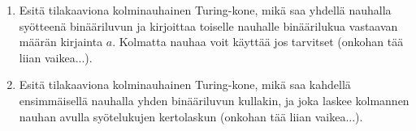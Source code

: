 \documentclass[finnish,11pt,draft]{article}
\newenvironment{automata}[1][2.8]%
{\begin{tikzpicture}[->,>=stealth',shorten >=1pt,auto,node distance=#1cm,semithick]}%
{\end{tikzpicture}}
\newenvironment{centerautomata}[1][2.8]%
{\begin{center}\begin{automata}[#1]}%
{\end{automata} \end{center}}
\newcommand{\spc}{\text{\textvisiblespace}}
\begin{document}
\begin{enumerate}

\item 
  Esitä tilakaaviona kolminauhainen Turing-kone, mikä saa yhdellä nauhalla
  syötteenä binääriluvun ja kirjoittaa toiselle nauhalle binäärilukua
  vastaavan määrän kirjainta $a$. Kolmatta nauhaa voit käyttää jos tarvitset
  (onkohan tää liian vaikea...).

\item
  Esitä tilakaaviona kolminauhainen Turing-kone, mikä saa kahdellä
  ensimmäisellä nauhalla yhden binääriluvun kullakin, ja joka laskee kolmannen
  nauhan avulla syötelukujen kertolaskun (onkohan tää liian vaikea...).
\end{enumerate}




\end{document}
